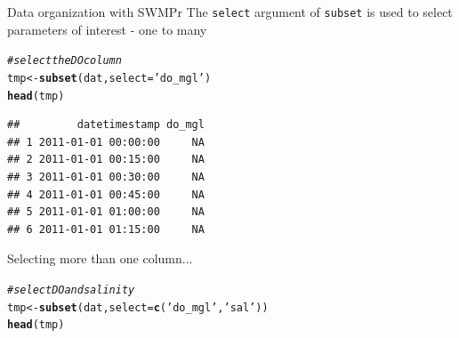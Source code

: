 \documentclass[xcolor=dvipsnames]{beamer}\usepackage[]{graphicx}\usepackage[]{color}
\makeatletter
\newcommand{\hlstr}[1]{\textcolor[rgb]{0.192,0.494,0.8}{#1}}%
\newcommand{\hlcom}[1]{\textcolor[rgb]{0.678,0.584,0.686}{\textit{#1}}}%
\newcommand{\hlstd}[1]{\textcolor[rgb]{0.345,0.345,0.345}{#1}}%
\newcommand{\hlkwb}[1]{\textcolor[rgb]{0.69,0.353,0.396}{#1}}%
\newcommand{\hlkwc}[1]{\textcolor[rgb]{0.333,0.667,0.333}{#1}}%
\newcommand{\hlkwd}[1]{\textcolor[rgb]{0.737,0.353,0.396}{\textbf{#1}}}%
\newenvironment{kframe}{%
 \def\at@end@of@kframe{}%
 \ifinner\ifhmode%
  \def\at@end@of@kframe{\end{minipage}}%
  \begin{minipage}{\columnwidth}%
 \fi\fi%
 \def\FrameCommand##1{\hskip\@totalleftmargin \hskip-\fboxsep
 \colorbox{shadecolor}{##1}\hskip-\fboxsep
     \hskip-\linewidth \hskip-\@totalleftmargin \hskip\columnwidth}%
 \MakeFramed {\advance\hsize-\width
   \@totalleftmargin\z@ \linewidth\hsize
   \@setminipage}}%
 {\par\unskip\endMakeFramed%
 \at@end@of@kframe}
\newenvironment{knitrout}{}{} %
\makeatother
\begin{document}
\begin{frame}[fragile]{Data organization with SWMPr}
\onslide<+->
The \texttt{select} argument of \texttt{subset} is used to select parameters of interest - one to many
\begin{knitrout}\scriptsize
{}\color{fgcolor}\begin{kframe}
\begin{alltt}
\hlcom{# select the DO column}
\hlstd{tmp} \hlkwb{<-} \hlkwd{subset}\hlstd{(dat,} \hlkwc{select} \hlstd{=} \hlstr{'do_mgl'}\hlstd{)}
\hlkwd{head}\hlstd{(tmp)}
\end{alltt}
\begin{verbatim}
##         datetimestamp do_mgl
## 1 2011-01-01 00:00:00     NA
## 2 2011-01-01 00:15:00     NA
## 3 2011-01-01 00:30:00     NA
## 4 2011-01-01 00:45:00     NA
## 5 2011-01-01 01:00:00     NA
## 6 2011-01-01 01:15:00     NA
\end{verbatim}
\end{kframe}
\end{knitrout}
Selecting more than one column...
\onslide<+->
\begin{knitrout}\scriptsize
{}\color{fgcolor}\begin{kframe}
\begin{alltt}
\hlcom{# select DO and salinity}
\hlstd{tmp} \hlkwb{<-} \hlkwd{subset}\hlstd{(dat,} \hlkwc{select} \hlstd{=} \hlkwd{c}\hlstd{(}\hlstr{'do_mgl'}\hlstd{,} \hlstr{'sal'}\hlstd{))}
\hlkwd{head}\hlstd{(tmp)}
\end{alltt}
\end{kframe}
\end{knitrout}
\end{frame}
\end{document}
